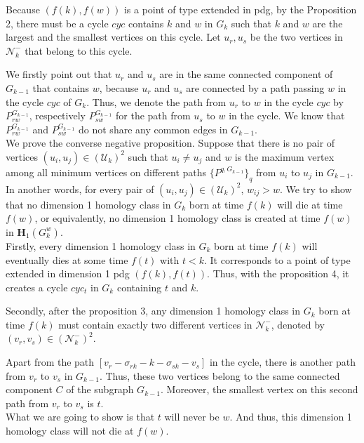 \documentclass[a4paper,12pt]{article}
\numberwithin{equation}{section}
\begin{document}
	Because $(f(k), f(w))$ is a point of type extended in pdg, by the Proposition 2, there must be a cycle $cyc$ contains $k$ and $w$ in $G_k$ such that $k$ and $w$ are the largest and the smallest vertices on this cycle. Let $u_r,u_s$ be the two vertices in $\mathcal{N}_k^-$ that belong to this cycle. 
	
	We firstly point out that $u_r$ and $u_s$ are in the same connected component of $G_{k-1}$ that contains $w$, because $u_r$ and $u_s$ are connected by a path passing $w$ in the cycle $cyc$ of $G_k$. Thus, we denote the path from $u_r$ to $w$ in the cycle $cyc$ by $P_{rw}^{G_{k-1}}$, respectively $P_{sw}^{G_{k-1}}$ for the path from $u_s$ to $w$ in the cycle. We know that $P_{rw}^{G_{k-1}}$ and $P_{sw}^{G_{k-1}}$ do not share any common edges in $G_{k-1}$.\\
	
	We prove the converse negative proposition. Suppose that there is no pair of vertices $(u_i, u_j) \in (\mathcal{U}_k)^2$ such that $u_i \neq u_j$ and $w$ is the maximum vertex among all minimum vertices on different paths $\{ P^{q,G_{k-1}} \}_q$ from $u_i$ to $u_j$ in $G_{k-1}$. In another words, for every pair of $(u_i, u_j) \in (\mathcal{U}_k)^2$, $w_{ij} > w$. We try to show that no dimension 1 homology class in $G_k$ born at time $f(k)$ will die at time $f(w)$, or equivalently, no dimension 1 homology class is created at time $f(w)$ in $\mathbf{H}_1(G^w_k)$. \\
	

	Firstly, every dimension 1 homology class in $G_k$ born at time $f(k)$ will eventually dies at some time $f(t)$ with $t<k$. It corresponds to a point of type extended in dimension 1 pdg $(f(k),f(t))$. Thus, with the proposition 4, it creates a cycle $cyc_{t}$ in $G_k$ containing $t$ and $k$. 
	
	Secondly, after the proposition 3, any dimension 1 homology class in $G_k$ born at time $f(k)$ must contain exactly two different vertices in $\mathcal{N}_k^-$, denoted by $(v_r,v_s) \in (\mathcal{N}_k^-)^2$.
	
	Apart from the path $[v_r - \sigma_{rk} - k - \sigma_{sk} - v_s]$ in the cycle, there is another path from $v_r$ to $v_s$ in $G_{k-1}$. Thus, these two vertices belong to the same connected component $C$ of the subgraph $G_{k-1}$. 
	Moreover, the smallest vertex on this second path from $v_r$ to $v_s$ is $t$.\\
		
	
	What we are going to show is that $t$ will never be $w$. And thus, this dimension 1 homology class will not die at $f(w)$.
	
\end{document}
